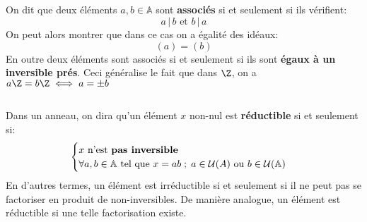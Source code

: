 \subsection*{}
On dit que deux éléments \( a, b \in \mathbb{A} \) sont \textbf{associés} si et seulement si ils vérifient:
\[ 
   a \, \big| \, b \text{ et } b \, \big| \, a
\]
On peut alors montrer que dans ce cas on a égalité des idéaux:
\[ 
   (a) = (b) 
\]
En outre deux éléments sont associés si et seulement si ils sont \textbf{égaux à un inversible prés}. Ceci généralise le fait que dans \( \Z \), on a \( a\Z = b\Z \iff a = \pm b\)
\subsection*{}
Dans un anneau, on dira qu'un élément \( x \) non-nul est \textbf{réductible} si et seulement si:
\[ 
    \begin{cases}
      x \text{ n'est \textbf{pas inversible}}\\
      \forall a, b \in \mathbb{A} \text{ tel que } x = ab \; ; \; a \in \mathcal{U}(A) \text{ ou } b \in \mathcal{U}(\mathbb{A})
    \end{cases}
\]
En d'autres termes, un élément est irréductible si et seulement si il ne peut pas se factoriser en produit de non-inversibles. De manière analogue, un élément est réductible si une telle factorisation existe.
